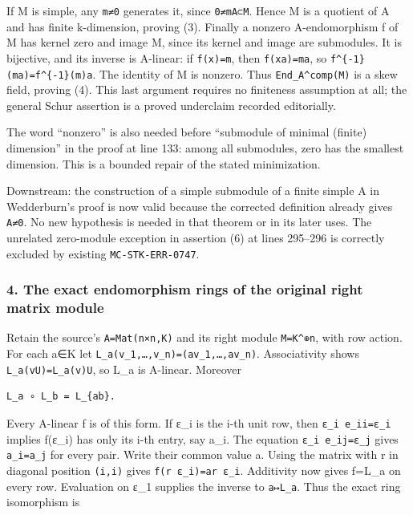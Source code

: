 If M is simple, any \texttt{m≠0} generates it, since \texttt{0≠mA⊂M}. Hence M is a quotient of A and has finite k-dimension, proving (3). Finally a nonzero A-endomorphism f of M has kernel zero and image M, since its kernel and image are submodules. It is bijective, and its inverse is A-linear: if \texttt{f(x)=m}, then \texttt{f(xa)=ma}, so \texttt{f\^{}\{-1\}(ma)=f\^{}\{-1\}(m)a}. The identity of M is nonzero. Thus \texttt{End\_A\^{}comp(M)} is a skew field, proving (4). This last argument requires no finiteness assumption at all; the general Schur assertion is a proved underclaim recorded editorially.

The word ``nonzero'' is also needed before ``submodule of minimal (finite) dimension'' in the proof at line 133: among all submodules, zero has the smallest dimension. This is a bounded repair of the stated minimization.

Downstream: the construction of a simple submodule of a finite simple A in Wedderburn's proof is now valid because the corrected definition already gives \texttt{A≠0}. No new hypothesis is needed in that theorem or in its later uses. The unrelated zero-module exception in assertion (6) at lines 295--296 is correctly excluded by existing \texttt{MC-STK-ERR-0747}.

\subsubsection{4. The exact endomorphism rings of the original right matrix module}\label{the-exact-endomorphism-rings-of-the-original-right-matrix-module}

Retain the source's \texttt{A=Mat(n×n,K)} and its right module \texttt{M=K\^{}⊕n}, with row action. For each a∈K let \texttt{L\_a(v\_1,…,v\_n)=(av\_1,…,av\_n)}. Associativity shows \texttt{L\_a(vU)=L\_a(v)U}, so L\_a is A-linear. Moreover

\begin{verbatim}
L_a ∘ L_b = L_{ab}.
\end{verbatim}

Every A-linear f is of this form. If ε\_i is the i-th unit row, then \texttt{ε\_i\ e\_ii=ε\_i} implies f(ε\_i) has only its i-th entry, say a\_i. The equation \texttt{ε\_i\ e\_ij=ε\_j} gives \texttt{a\_i=a\_j} for every pair. Write their common value a. Using the matrix with r in diagonal position \texttt{(i,i)} gives \texttt{f(r\ ε\_i)=ar\ ε\_i}. Additivity now gives f=L\_a on every row. Evaluation on ε\_1 supplies the inverse to \texttt{a↦L\_a}. Thus the exact ring isomorphism is

